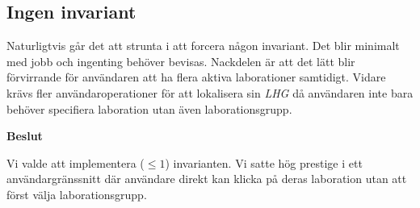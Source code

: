\subsection{Ingen invariant}
Naturligtvis går det att strunta i att forcera någon invariant. Det blir minimalt med jobb och ingenting behöver bevisas. Nackdelen är att det lätt blir förvirrande för användaren att ha flera aktiva laborationer samtidigt. Vidare krävs fler användaroperationer för att lokalisera sin \emph{LHG} då användaren inte bara behöver specifiera laboration utan även laborationsgrupp.

\begin{flushright}
  
  \textbf{Beslut}
  
  Vi valde att implementera ($\leq 1$) invarianten. Vi satte hög prestige i ett användargränssnitt där användare direkt kan klicka på deras laboration utan att först välja laborationsgrupp.
\end{flushright}
